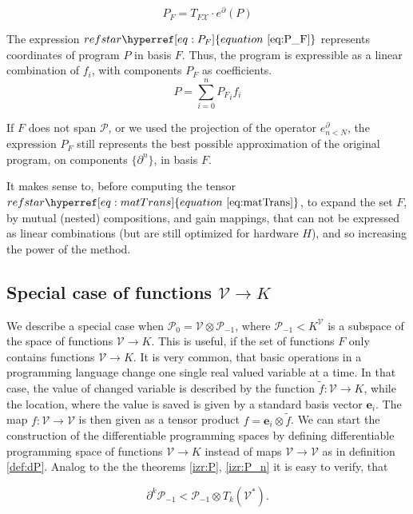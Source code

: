 \documentclass{article}
\makeatletter
\newcommand{\VV}{\mathcal{V}}
\newcommand{\e}{\mathbf{e}}
\newcommand{\X}{\mathcal{X}}
\newcommand{\dP}{\mathcal{P}}
\newcommand{\D}{\partial}
\let\originaleqref\eqref %
\renewcommand{\eqref}[1]{%
  \begingroup%
  \let\ref\@refstar%
  \hyperref[#1]{%
    equation%
    ~\originaleqref{#1}%
  }%
  \endgroup
}
\makeatother
\begin{document}
  \begin{equation}\label{eq:P_F}
  	P_F=T_{F\X}\cdot e^\D(P)
  \end{equation}
  
  The expression $\eqref{eq:P_F}$ represents coordinates of program $P$ in basis $F$. Thus, the program is expressible as a linear combination of $f_i$, with components $P_F$ as coefficients.
  \begin{equation}
  P=\sum\limits_{i=0}^{n}{P_F}_if_i
  \end{equation}
  
  If $F$ does not span $\dP$, or we used the projection of the operator $e^\D_{n<N}$, the expression $P_F$ still represents the best possible approximation of the original program, on components $\{\D^n\}$, in basis $F$.
  
  It makes sense to, before computing the tensor $\eqref{eq:matTrans}$, to expand the set $F$, by mutual (nested) compositions, and gain mappings, that can not be expressed as linear combinations (but are still optimized for hardware $H$), and so increasing the power of the method.
\subsection{Special case of functions $\VV\to K$}
We describe a special case when $\dP_0=\VV\otimes\dP_{-1}$, where
$\dP_{-1}<K^\VV$ is a subspace of the space of functions $\VV\to K$. This is
useful, if the set of functions $F$ only contains functions $\VV\to K$. It is
very common, that basic operations in a programming language change one single
real valued variable at a time. In that case, the value of changed variable is
described by the function $\tilde{f}:\VV\to K$, while the location, where the
value is saved is given by a standard basis vector $\e_i$. The map $f:\VV\to \VV$
is then given as a tensor product $f=\e_i\otimes \tilde{f}$. We can start the
construction of the differentiable programming spaces by defining differentiable
programming space of functions $\VV\to K$ instead of maps $\VV\to \VV$ as in
definition \ref{def:dP}.  Analog to the the theorems \ref{izr:P}, \ref{izr:P_n}
it is easy to verify, that

\begin{equation}
  \label{eq:tilda_dP}
  \D^k\dP_{-1} < \dP_{-1}\otimes T_k(\VV^*).
\end{equation}
\end{document}
